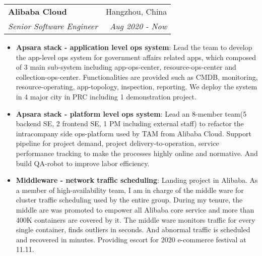 \documentclass[letterpaper,11pt]{article}
\makeatletter
\newcommand{\resumeItem}[2]{
	\item\small{
		\textbf{#1}{: #2 \vspace{-2pt}}
	}
}
\newcommand{\resumeSubheading}[4]{
	\vspace{-1pt}\item
	\begin{tabular*}{0.97\textwidth}[t]{l@{\extracolsep{\fill}}r}
		\textbf{#1} & #2 \\
		\textit{\small#3} & \textit{\small #4} \\
	\end{tabular*}\vspace{-5pt}
}
\newcommand{\resumeItemListStart}{\begin{itemize}}
\newcommand{\resumeItemListEnd}{\end{itemize}\vspace{-5pt}}
\makeatother
\begin{document}
\begin{spacing}{0.80}
	\resumeSubheading
	{Alibaba Cloud}{Hangzhou, China}
	{Senior Software Engineer}{Aug 2020 - Now}
	\resumeItemListStart
	\resumeItem{Apsara stack - application level ops system}
	{Lead the team to develop the app-level ops system for government affairs related apps, which composed of 3 main sub-system including app-ops-center, resource-ops-center and collection-ops-center. Functionalities are provided such as CMDB, monitoring, resource-operating, app-topology, inspection, reporting. We deploy the system in 4 major city in PRC including 1 demonstration project.}
	\resumeItem{Apsara stack - platform level ops system}
	{Lead an 8-member team(5 backend SE, 2 frontend SE, 1 PM including external staff) to refactor the intracompany side ops-platform used by TAM from Alibaba Cloud. Support pipeline for project demand, project delivery-to-operation, service performance tracking to make the processes highly online and normative. And build QA-robot to improve labor efficiency.}
	\resumeItem{Middleware - network traffic scheduling}
	{Landing project in Alibaba. As a member of high-availability team, I am in charge of the middle ware for cluster traffic scheduling used by the entire group. During my tenure, the middle are was promoted to empower all Alibaba core service and more than 400K containers are covered by it. The middle ware monitors traffic for every single container, finds outliers in seconds. And abnormal traffic is scheduled and recovered in minutes. Providing escort for 2020 e-commerce festival at 11.11.}
	\resumeItemListEnd
	

\end{spacing}
\end{document}
